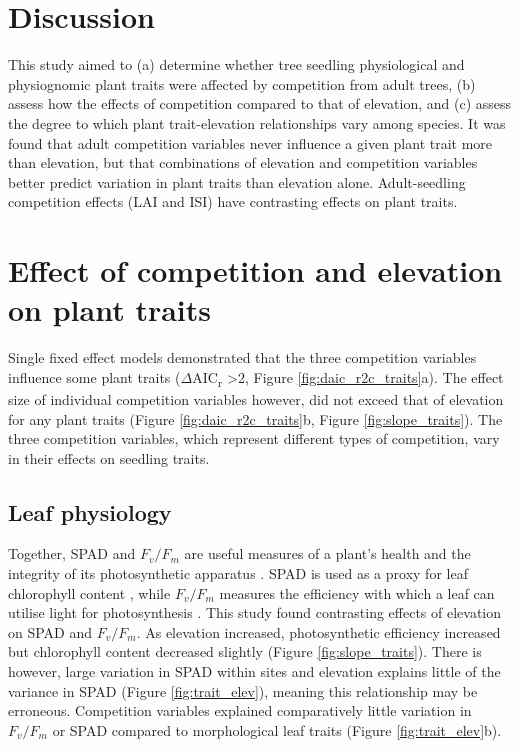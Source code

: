 \documentclass[a4paper, 11pt]{article}
\begin{document}
\section*{Discussion}

This study aimed to (a) determine whether tree seedling physiological and physiognomic plant traits were affected by competition from adult trees, (b) assess how the effects of competition compared to that of elevation, and (c) assess the degree to which plant trait-elevation relationships vary among species. It was found that adult competition variables never influence a given plant trait more than elevation, but that combinations of elevation and competition variables better predict variation in plant traits than elevation alone. Adult-seedling competition effects (LAI and ISI) have contrasting effects on plant traits.

\section{Effect of competition and elevation on plant traits}

Single fixed effect models demonstrated that the three competition variables influence some plant traits ($\Delta$AIC\textsubscript{r} >2, Figure \ref{fig:daic_r2c_traits}a). The effect size of individual competition variables however, did not exceed that of elevation for any plant traits (Figure \ref{fig:daic_r2c_traits}b, Figure \ref{fig:slope_traits}).  The three competition variables, which represent different types of competition, vary in their effects on seedling traits.

\subsection*{Leaf physiology}
Together, SPAD and $F_v/F_m$ are useful measures of a plant's health and the integrity of its photosynthetic apparatus \citep{Clark2000}. SPAD is used as a proxy for leaf chlorophyll content \citep{Richardson2002}, while $F_v/F_m$ measures the efficiency with which a leaf can utilise light for photosynthesis \citep{Maxwell2000}. This study found contrasting effects of elevation on SPAD and $F_v/F_m$. As elevation increased, photosynthetic efficiency increased but chlorophyll content decreased slightly (Figure \ref{fig:slope_traits}). There is however, large variation in SPAD within sites and elevation explains little of the variance in SPAD (Figure \ref{fig:trait_elev}), meaning this relationship may be erroneous. Competition variables explained comparatively little variation in $F_v/F_m$ or SPAD compared to morphological leaf traits (Figure \ref{fig:trait_elev}b).
\end{document}
